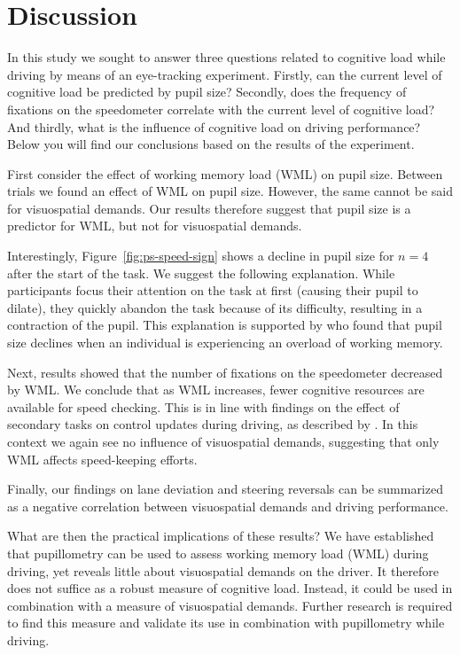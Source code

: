 
\section{Discussion}\label{sec:discussion}
In this study we sought to answer three questions related to cognitive load while driving by means of an eye-tracking experiment.
Firstly, can the current level of cognitive load be predicted by pupil size? 
Secondly, does the frequency of fixations on the speedometer correlate with the current level of cognitive load?
And thirdly, what is the influence of cognitive load on driving performance?
Below you will find our conclusions based on the results of the experiment.

First consider the effect of working memory load (WML) on pupil size.
Between trials we found an effect of WML on pupil size. 
However, the same cannot be said for visuospatial demands. 
Our results therefore suggest that pupil size is a predictor for WML, but not for visuospatial demands.

Interestingly, Figure~\ref{fig:ps-speed-sign} shows a decline in pupil size for \(n=4\) after the start of the \nback task.
We suggest the following explanation.
While participants focus their attention on the task at first (causing their pupil to dilate), they quickly abandon the task because of its difficulty, resulting in a contraction of the pupil.
This explanation is supported by \citet{Granholm1996} who found that pupil size declines when an individual is experiencing an overload of working memory.

Next, results showed that the number of fixations on the speedometer decreased by WML.\@
We conclude that as WML increases, fewer cognitive resources are available for speed checking.
This is in line with findings on the effect of secondary tasks on control updates during driving, as described by \citet{Salvucci2011}.
In this context we again see no influence of visuospatial demands, suggesting that only WML affects speed-keeping efforts.

Finally, our findings on lane deviation and steering reversals can be summarized as a negative correlation between visuospatial demands and driving performance.

What are then the practical implications of these results? 
We have established that pupillometry can be used to assess working memory load (WML) during driving, yet reveals little about visuospatial demands on the driver.
It therefore does not suffice as a robust measure of cognitive load.
Instead, it could be used in combination with a measure of visuospatial demands.
Further research is required to find this measure and validate its use in combination with pupillometry while driving.

